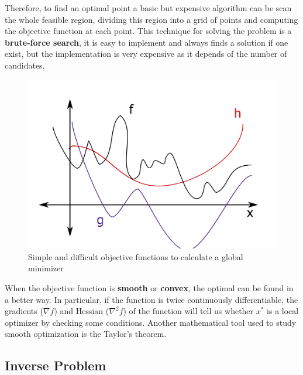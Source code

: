 \begin{minipage}{0.45\linewidth}
Therefore, to find an optimal point a basic but expensive algorithm can be scan the whole feasible region, dividing this region into a grid of points and computing the objective function at each point. This technique for solving the problem is a \textbf{brute-force search}, it is easy to implement and always finds a solution if one exist, but the implementation is very expensive as it depends of the number of candidates.
\end{minipage}\hfill
\begin{minipage}{0.45\linewidth}
\begin{figure}[H]
    \centering
    \includegraphics[width=\linewidth]{Images/optimizers.png}
    \caption{Simple and difficult objective functions to calculate a global minimizer}
    \label{fig:optimizers}
\end{figure}
\end{minipage} \vspace{15pt}

When the objective function is \textbf{smooth} or \textbf{convex}, the optimal can be found in a better way. In particular, if the function
is twice continuously differentiable, the gradients ($\nabla f$) and Hessian ($\nabla^2 f$) of the function will tell us whether $x^*$ is a local optimizer by checking some conditions. Another mathematical tool used to study smooth optimization is the Taylor’s theorem. \cite{numerical_opt}

\subsection{Inverse Problem}

